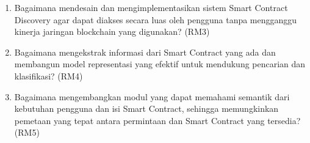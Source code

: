 \begin{enumerate}
  \item Bagaimana mendesain dan mengimplementasikan sistem Smart Contract Discovery agar dapat diakses secara luas oleh pengguna tanpa mengganggu kinerja jaringan blockchain yang digunakan? (RM3)
  \item Bagaimana mengekstrak informasi dari Smart Contract yang ada dan membangun model representasi yang efektif untuk mendukung pencarian dan klasifikasi? (RM4)
  \item Bagaimana mengembangkan modul yang dapat memahami semantik dari kebutuhan pengguna dan isi Smart Contract, sehingga memungkinkan pemetaan yang tepat antara permintaan dan Smart Contract yang tersedia? (RM5)
\end{enumerate}



